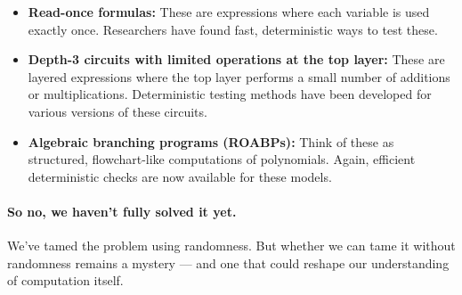 \begin{itemize}
  \item \textbf{Read-once formulas:} These are expressions where each variable is used exactly once. Researchers have found fast, deterministic ways to test these.
  \item \textbf{Depth-3 circuits with limited operations at the top layer:} These are layered expressions where the top layer performs a small number of additions or multiplications. Deterministic testing methods have been developed for various versions of these circuits.
  \item \textbf{Algebraic branching programs (ROABPs):} Think of these as structured, flowchart-like computations of polynomials. Again, efficient deterministic checks are now available for these models.
\end{itemize}



\paragraph{So no, we haven't fully solved it yet.} We’ve tamed the problem using randomness. But whether we can tame it without randomness remains a mystery — and one that could reshape our understanding of computation itself.

